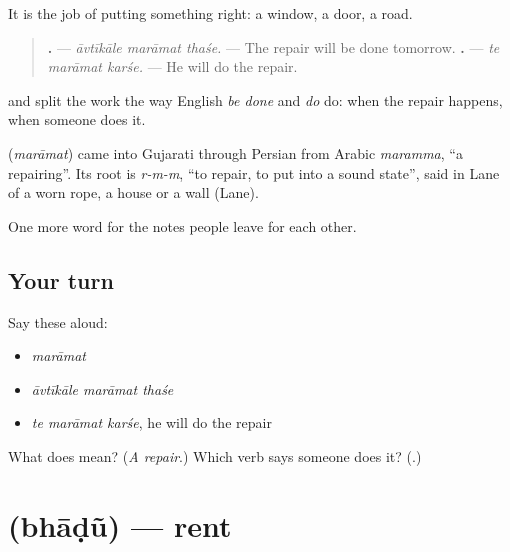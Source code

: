 It is the job of putting something right: a window, a door, a road.

\begin{quote}
\textbf{  .} — \emph{āvtīkāle marāmat thaśe.} — The repair will be done tomorrow. \textbf{  .} — \emph{te marāmat karśe.} — He will do the repair.
\end{quote}

\textbf{} and \textbf{} split the work the way English \emph{be done} and \emph{do} do: \textbf{} when the repair happens, \textbf{} when someone does it.

\begin{cousinweb}
\textbf{} (\emph{marāmat}) came into Gujarati through Persian from Arabic \emph{maramma}, \textquotedblleft{}a repairing\textquotedblright{}. Its root is \emph{r-m-m}, \textquotedblleft{}to repair, to put into a sound state\textquotedblright{}, said in Lane of a worn rope, a house or a wall (Lane).
\end{cousinweb}

\begin{grammarlens}[title={What you've built}]
One more word for the notes people leave for each other.
\end{grammarlens}

\subsection*{Your turn}
Say these aloud:

\begin{itemize}
\raggedright
  \item \emph{marāmat}
  \item \emph{āvtīkāle marāmat thaśe}
  \item \emph{te marāmat karśe}, he will do the repair
\end{itemize}

\begin{tcolorbox}[breakable,colback=teal!4,colframe=teal!35!black,title={Before you move on}]
What does \textbf{} mean? (\emph{A repair}.) Which verb says someone does it? (\textbf{}.)
\end{tcolorbox}
\section[\texorpdfstring{\gu{ભાડું} (bhāḍũ)}{ભાડું (bhāḍũ)}]{ (bhāḍũ) — rent}

